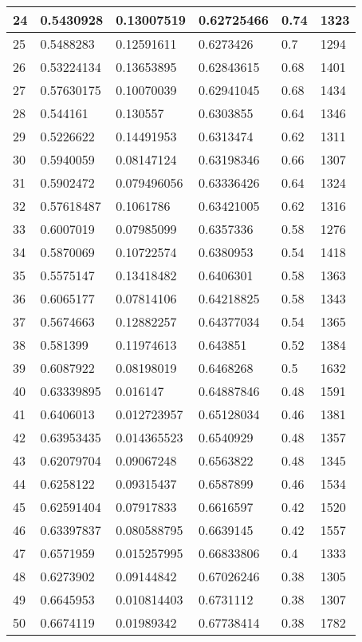 \begin{longtable}{|l|l|l|l|l|l|}
24 & 0.5430928 & 0.13007519 & 0.62725466 & 0.74 & 1323 \\ \hline 
25 & 0.5488283 & 0.12591611 & 0.6273426 & 0.7 & 1294 \\ \hline 
26 & 0.53224134 & 0.13653895 & 0.62843615 & 0.68 & 1401 \\ \hline 
27 & 0.57630175 & 0.10070039 & 0.62941045 & 0.68 & 1434 \\ \hline 
28 & 0.544161 & 0.130557 & 0.6303855 & 0.64 & 1346 \\ \hline 
29 & 0.5226622 & 0.14491953 & 0.6313474 & 0.62 & 1311 \\ \hline 
30 & 0.5940059 & 0.08147124 & 0.63198346 & 0.66 & 1307 \\ \hline 
31 & 0.5902472 & 0.079496056 & 0.63336426 & 0.64 & 1324 \\ \hline 
32 & 0.57618487 & 0.1061786 & 0.63421005 & 0.62 & 1316 \\ \hline 
33 & 0.6007019 & 0.07985099 & 0.6357336 & 0.58 & 1276 \\ \hline 
34 & 0.5870069 & 0.10722574 & 0.6380953 & 0.54 & 1418 \\ \hline 
35 & 0.5575147 & 0.13418482 & 0.6406301 & 0.58 & 1363 \\ \hline 
36 & 0.6065177 & 0.07814106 & 0.64218825 & 0.58 & 1343 \\ \hline 
37 & 0.5674663 & 0.12882257 & 0.64377034 & 0.54 & 1365 \\ \hline 
38 & 0.581399 & 0.11974613 & 0.643851 & 0.52 & 1384 \\ \hline 
39 & 0.6087922 & 0.08198019 & 0.6468268 & 0.5 & 1632 \\ \hline 
40 & 0.63339895 & 0.016147 & 0.64887846 & 0.48 & 1591 \\ \hline 
41 & 0.6406013 & 0.012723957 & 0.65128034 & 0.46 & 1381 \\ \hline 
42 & 0.63953435 & 0.014365523 & 0.6540929 & 0.48 & 1357 \\ \hline 
43 & 0.62079704 & 0.09067248 & 0.6563822 & 0.48 & 1345 \\ \hline 
44 & 0.6258122 & 0.09315437 & 0.6587899 & 0.46 & 1534 \\ \hline 
45 & 0.62591404 & 0.07917833 & 0.6616597 & 0.42 & 1520 \\ \hline 
46 & 0.63397837 & 0.080588795 & 0.6639145 & 0.42 & 1557 \\ \hline 
47 & 0.6571959 & 0.015257995 & 0.66833806 & 0.4 & 1333 \\ \hline 
48 & 0.6273902 & 0.09144842 & 0.67026246 & 0.38 & 1305 \\ \hline 
49 & 0.6645953 & 0.010814403 & 0.6731112 & 0.38 & 1307 \\ \hline 
50 & 0.6674119 & 0.01989342 & 0.67738414 & 0.38 & 1782 \\ \hline 
\end{longtable}